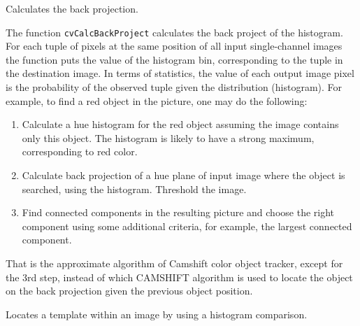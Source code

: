 Calculates the back projection.


\begin{description}
\end{description}

The function \texttt{cvCalcBackProject} calculates the back project of the histogram. For each tuple of pixels at the same position of all input single-channel images the function puts the value of the histogram bin, corresponding to the tuple in the destination image. In terms of statistics, the value of each output image pixel is the probability of the observed tuple given the distribution (histogram). For example, to find a red object in the picture, one may do the following:

\begin{enumerate}
 \item Calculate a hue histogram for the red object assuming the image contains only this object. The histogram is likely to have a strong maximum, corresponding to red color.
 \item Calculate back projection of a hue plane of input image where the object is searched, using the histogram. Threshold the image.
 \item Find connected components in the resulting picture and choose the right component using some additional criteria, for example, the largest connected component.
\end{enumerate}

That is the approximate algorithm of Camshift color object tracker, except for the 3rd step, instead of which CAMSHIFT algorithm is used to locate the object on the back projection given the previous object position.

\label{CalcBackProjectPatch}

Locates a template within an image by using a histogram comparison.


